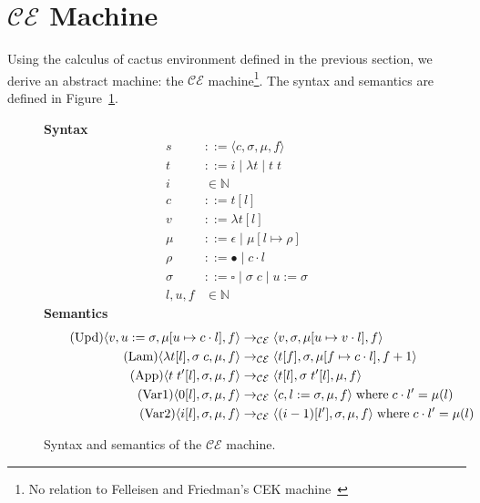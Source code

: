 \section{$\mathcal{CE}$ Machine} \label{sec:mach}

Using the calculus of cactus environment defined in the previous section, we
derive an abstract machine: the $\mathcal{CE}$ machine\footnote{No relation to
Felleisen and Friedman's CEK machine~\cite{felleisen1986control}}. The syntax
and semantics are defined in Figure~\ref{fig:CEM}. 

\begin{figure}
\textbf{Syntax}
\begin{align*}
\tag{State} s &::= \langle c, \sigma, \mu, f \rangle \\
\tag{Term} t &::= i \; | \; \lambda t \; | \; t \; t  \\
\tag{Variable} i &\in \mathbb{N}  \\
\tag{Closure} c &::= t [l] \\
\tag{Value} v &::= \lambda t[l] \\
\tag{Heap} \mu &::= \epsilon \; | \; \mu [ l \mapsto \rho ] \\
\tag{Environment} \rho &::= \bullet \; | \; c \cdot l \\
\tag{Context} \sigma &::= \square \; | \; \sigma \; c \;  | \; u:=\sigma \\
\tag{Location} l,u,f &\in \mathbb{N}
\end{align*}
\textbf{Semantics}
\begin{align*}
\tag{Upd}
\langle v, u := \sigma, \mu[u \mapsto c \cdot l], f \rangle 
  &\rightarrow_{\mathcal{CE}}
\langle v, \sigma, \mu[u \mapsto v \cdot l], f \rangle  \\
\tag{Lam}
\langle \lambda t[l], \sigma \; c, \mu, f \rangle 
  &\rightarrow_{\mathcal{CE}}
\langle t[f], \sigma, \mu[f \mapsto c \cdot l], f+1 \rangle  \\
\tag{App}
\langle t \; t'[l], \sigma, \mu, f \rangle
  &\rightarrow_{\mathcal{CE}}
\langle t[l], \sigma \; t'[l], \mu, f \rangle \\
\tag{Var1}
\langle 0[l], \sigma, \mu, f \rangle
  &\rightarrow_{\mathcal{CE}}
\langle c, l := \sigma, \mu, f \rangle 
\; \textnormal{where} \; c \cdot l' = \mu(l)\\
\tag{Var2}
\langle i[l], \sigma, \mu, f \rangle
  &\rightarrow_{\mathcal{CE}}
\langle (i-1)[l'], \sigma, \mu, f \rangle
\; \textnormal{where} \; c \cdot l' = \mu(l)
\end{align*}
\caption{Syntax and semantics of the $\mathcal{CE}$ machine.}
\label{fig:CEM}
\end{figure}

